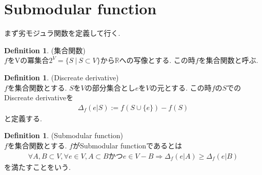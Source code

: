 \documentclass[11pt, a4paper, dvipdfmx]{jsarticle}
\theoremstyle{definition}
\newtheorem{Definition+}[Axiom+]{Definition}
\newcommand{\R}{\mathbb{R}}
\begin{document}
\section{Submodular function}
まず劣モジュラ関数を定義して行く.
\begin{Definition+}(集合関数)\\
   $f$をVの冪集合$2^{V} = \{S~|~S\subset V\}$から$\R$への写像とする. この時$f$を集合関数と呼ぶ.
\end{Definition+}
\begin{Definition+}(Discreate derivative)\\
    $f$を集合関数とする. $S$を$V$の部分集合とし$e$を$V$の元とする. この時$f$の$S$での
    Discreate derivativeを
    \begin{align*}
        \Delta_{f}(e | S) := f(S\cup\{e\}) - f(S)
    \end{align*}
    と定義する.
\end{Definition+}
\begin{Definition+}(Submodular function)\\
    $f$を集合関数とする. $f$がSubmodular functionであるとは
    \begin{align*}
        \forall A, B\subset V, \forall e\in V,A\subset B かつe\in V - B\Longrightarrow \Delta_{f}(e | A)\geq\Delta_{f}(e | B)
    \end{align*}
    を満たすことをいう.
\end{Definition+}
\end{document}
